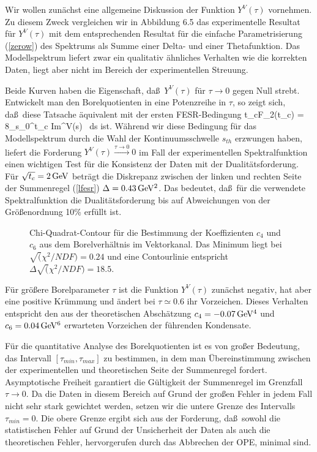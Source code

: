 Wir wollen zun\"achst eine allgemeine Diskussion der Funktion 
$Y^V(\tau)$ vornehmen. Zu diesem Zweck vergleichen wir in 
Abbildung 6.5 das experimentelle Resultat f\"ur $Y^V(\tau)$ mit
dem entsprechenden Resultat f\"ur die einfache Parametrisierung 
(\ref{zerow}) des  Spektrums als Summe einer Delta- und einer
Thetafunktion. Das Modellspektrum liefert zwar ein qualitativ
\"ahnliches Verhalten wie die korrekten Daten, liegt aber
nicht im Bereich der experimentellen Streuung. 

Beide Kurven haben die Eigenschaft, da\ss\ $Y^V(\tau)$ f\"ur 
$\tau\to 0$ gegen Null strebt. Entwickelt man den Borelquotienten 
in eine Potenzreihe in $\tau$, so zeigt sich, da\ss\ diese Tatsache
\"aquivalent mit der ersten FESR-Bedingung 
\be
\label{lfesr}
 t_cF_2(t_c) = 8\pi \int_{s_0}^{t_c} {\rm Im}\Pi^V(s) \, ds
\ee
ist. W\"ahrend wir diese Bedingung f\"ur das Modellspektrum
durch die Wahl der Kontinuumsschwelle $s_{th}$ erzwungen haben,
liefert die Forderung $Y^V(\tau)\stackrel{\tau\to 0}{\longrightarrow}0$
im Fall der experimentellen Spektralfunktion   einen wichtigen Test
f\"ur die Konsistenz der Daten mit der Dualit\"atsforderung. 
F\"ur $\sqrt{t_c}=2\,\rm GeV$ betr\"agt die Diskrepanz zwischen der 
linken und rechten Seite der Summenregel (\ref{lfesr}) 
$\Delta = 0.43\,\rm GeV^2$. Das bedeutet, da\ss\ f\"ur die verwendete 
Spektralfunktion die Dualit\"atsforderung  bis auf Abweichungen von 
der Gr\"o\ss enordnung 10\% erf\"ullt ist. 
\begin{figure}
\caption{Chi-Quadrat-Contour f\"ur die Bestimmung der Koeffizienten 
$c_4$ und $c_6$ aus dem Borelverh\"altnis im Vektorkanal. Das Minimum
liegt bei $\surd (\chi^2/NDF)=0.24$ und eine Contourlinie entspricht
$\Delta\surd (\chi^2/NDF)=18.5$.}
\vspace{9cm}
\end{figure}

F\"ur gr\"o\ss ere Borelparameter $\tau$ ist die Funktion $Y^V(\tau)$ 
zun\"achst negativ, hat aber eine positive Kr\"ummung und \"andert bei 
$\tau\simeq 0.6$ ihr Vorzeichen. Dieses Verhalten entspricht den aus
der theoretischen Absch\"atzung $c_4=-0.07\,\rm GeV^4$ und $c_6=0.04\,\rm GeV^6$ 
erwarteten Vorzeichen der f\"uhrenden Kondensate.

F\"ur die quantitative Analyse des Borelquotienten ist es von 
gro\ss er  Bedeutung, das Intervall $[\tau_{min},\tau_{max}]$
zu bestimmen, in dem man \"Ubereinstimmung zwischen der experimentellen 
und theoretischen Seite der  Summenregel fordert. Asymptotische
Freiheit garantiert die G\"ultigkeit der Summenregel im Grenzfall 
$\tau\to 0$. Da die Daten in diesem Bereich auf Grund der gro\ss en 
Fehler in jedem Fall nicht sehr stark gewichtet werden, setzen wir
die untere Grenze des Intervalls $\tau_{min}=0$. Die obere Grenze
ergibt sich aus der Forderung, da\ss\ sowohl die statistischen
Fehler auf Grund der Unsicherheit der Daten als auch die theoretischen 
Fehler, hervorgerufen durch das Abbrechen der OPE, minimal sind.  

